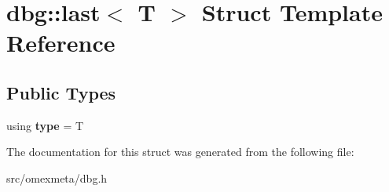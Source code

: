 \hypertarget{structdbg_1_1last_3_01T_01_4}{}\section{dbg\+:\+:last$<$ T $>$ Struct Template Reference}
\label{structdbg_1_1last_3_01T_01_4}
\subsection*{Public Types}
\begin{DoxyCompactItemize}
\item 
\mbox{\label{structdbg_1_1last_3_01T_01_4_a6715c2f60dfaa8a096517ce45ff43999}} 
using {\bfseries type} = T
\end{DoxyCompactItemize}


The documentation for this struct was generated from the following file\+:\begin{DoxyCompactItemize}
\item 
src/omexmeta/dbg.\+h\end{DoxyCompactItemize}
